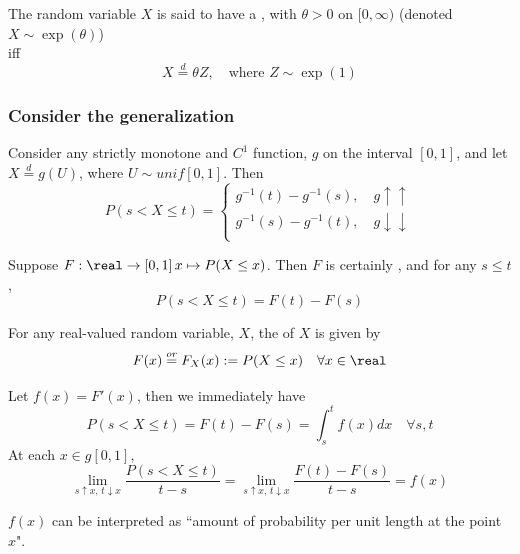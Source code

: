 \documentclass[11pt]{article}
\numberwithin{equation}{section}
\begin{document}
 The random variable $X$ is said to have a , with  $\theta > 0$ on $[0, \infty)$ (denoted $X \sim \exp(\theta)$)\\
iff \\
\begin{equation}
	X \overset{d}{=} \theta Z, \quad \text{where } Z \sim \exp(1)
\end{equation}

\subsubsection{Consider the generalization}
Consider any strictly monotone and $C^1$ function, $g$ on the interval $[0, 1]$, and let $X \overset{d}{=} g(U)$, where $U \sim unif[0, 1]$. Then
\begin{equation}
	P(s < X \leq t) = \begin{cases}
		g^{-1}(t) - g^{-1}(s), \quad g \uparrow\uparrow\\
		g^{-1}(s) - g^{-1}(t), \quad g \downarrow\downarrow\\
	\end{cases}
\end{equation}

\corollary Suppose $F: \real \rightarrow [0, 1] \, x \mapsto P(X \leq x)$. Then $F$ is certainly , and for any $s \leq t$, 
\begin{equation}
	P(s < X \leq t) = F(t) - F(s)
\end{equation}

 For any real-valued random variable, $X$, the  of $X$ is given by
\begin{equation}
	F(x) \overset{or}{=} F_X(x) := P(X \leq x) \quad \forall x \in \real
\end{equation}

\remark
Let $f(x) = F'(x)$, then we immediately have
\begin{equation}
	P(s < X \leq t) = F(t) - F(s) = \int_s^t f(x) dx \quad \forall s, t
\end{equation}
At each $x \in g[0, 1]$,
\begin{equation}
	\lim_{s \uparrow x, \, t \downarrow x} \frac{P(s < X \leq t)}{t - s} = \lim_{s \uparrow x, \, t \downarrow x} \frac{F(t) - F(s)}{t - s} = f(x)
\end{equation}

\remark
$f(x)$ can be interpreted as ``amount of probability per unit length at the point $x$".
\end{document}
